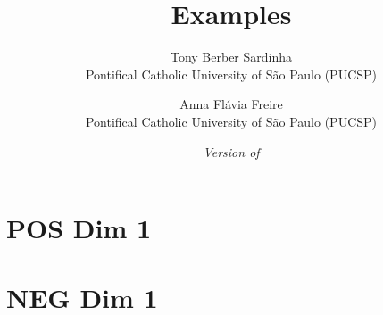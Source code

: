 \documentclass[letterpaper,10pt]{article}
\title{Examples}
\author{
  Tony Berber Sardinha \\ Pontifical Catholic University of São Paulo (PUCSP) \and
  Anna Flávia Freire \\ Pontifical Catholic University of São Paulo (PUCSP)
}
\date{\small\textit{Version of \DTMnow}}
\begin{document}
\maketitle

\tableofcontents

\section{POS Dim 1}





















\section{NEG Dim 1}
\end{document}
